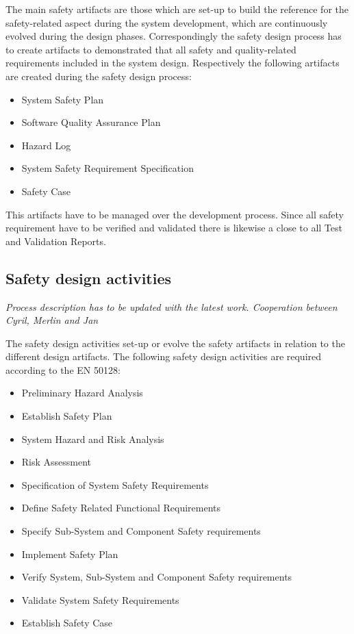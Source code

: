 \documentclass{template/openetcs_report}
\begin{document}
The main safety artifacts are those which are set-up to build the reference for the safety-related aspect during the system development, which are continuously evolved during the design phases. Correspondingly the safety design process has to create artifacts to demonstrated that all safety and quality-related requirements included in the system design. Respectively the following artifacts are created during the safety design process:

\begin{itemize}
\item System Safety Plan
\item Software Quality Assurance Plan
\item Hazard Log
\item System Safety Requirement Specification
\item Safety Case
\end{itemize} 

This artifacts have to be managed over the development process. Since all safety requirement have to be verified and validated there is likewise a close to all Test and Validation Reports.

\subsection{Safety design activities}
\label{safetyactivities}

\textit{Process description has to be updated with the latest work. Cooperation between Cyril, Merlin and Jan}


The safety design activities set-up or evolve the safety artifacts in relation to the different design artifacts. The following safety design activities are required according to the EN 50128:

\begin{itemize}
\item Preliminary Hazard Analysis
\item Establish Safety Plan
\item System Hazard and Risk Analysis
\item Risk Assessment
\item Specification of System Safety Requirements
\item Define Safety Related Functional Requirements
\item Specify Sub-System and Component Safety requirements
\item Implement Safety Plan
\item Verify System, Sub-System and Component Safety requirements
\item Validate System Safety Requirements
\item Establish Safety Case
\end{itemize}
\end{document}
